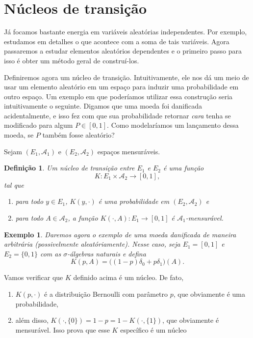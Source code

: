 \documentclass[reqno, final]{book}
\newcommand*\1{\mathds{1}}
\newtheorem{definition}[theorem]{Definição}
\newtheorem{example}{Exemplo}[section]
\begin{document}
\section{Núcleos de transição}

Já focamos bastante energia em variáveis aleatórias independentes.
Por exemplo, estudamos em detalhes o que acontece com a soma de tais variáveis.
Agora passaremos a estudar elementos aleatórios dependentes e o primeiro passo para isso é obter um método geral de construí-los.

Definiremos agora um núcleo de transição.
Intuitivamente, ele nos dá um meio de usar um elemento aleatório em um espaço para induzir uma probabilidade em outro espaço.
Um exemplo em que poderíamos utilizar essa construção seria intuitivamente o seguinte.
Digamos que uma moeda foi danificada acidentalmente, e isso fez com que sua probabilidade retornar \emph{cara} tenha se modificado para algum $P \in [0,1]$.
Como modelaríamos um lançamento dessa moeda, se $P$ também fosse aleatório?

Sejam $(E_1, \mathcal{A}_1)$ e $(E_2, \mathcal{A}_2)$ espaços mensuráveis.

\begin{definition}
  Um núcleo de transição entre $E_1$ e $E_2$ é uma função 
  \begin{equation}
    K: E_1 \times \mathcal{A}_2 \to [0,1],
  \end{equation}
  tal que
  \begin{enumerate}[\quad a)]
  \item para todo $y \in E_1$, $K(y,\cdot)$ é uma probabilidade em $(E_2, \mathcal{A}_2)$ e
  \item para todo $A \in \mathcal{A}_2$, a função $K(\cdot, A): E_1 \to [0,1]$ é $\mathcal{A}_1$-mensurável.
  \end{enumerate}
\end{definition}

\begin{example}
  \label{x:moeda_danificada}
  Daremos agora o exemplo de uma moeda danificada de maneira arbitrária (possivelmente aleatóriamente).
  Nesse caso, seja $E_1 = [0,1]$ e $E_2 = \{0,1\}$ com as $\sigma$-álgebras naturais e defina
  \begin{equation}
    K(p, A) = \big( (1-p)\delta_0 + p \delta_1 \big) (A).
  \end{equation}
\end{example}

Vamos verificar que $K$ definido acima é um núcleo.
De fato,
\begin{enumerate}[\quad i)]
\item $K(p, \cdot)$ é a distribuição Bernoulli com parâmetro $p$, que obviamente é uma probabilidade,
\item além disso, $K(\cdot, \{0\}) = 1-p = 1 - K(\cdot,\{1\})$, que obviamente é mensurável.
Isso prova que esse $K$ específico é um núcleo
\end{enumerate}
\end{document}
